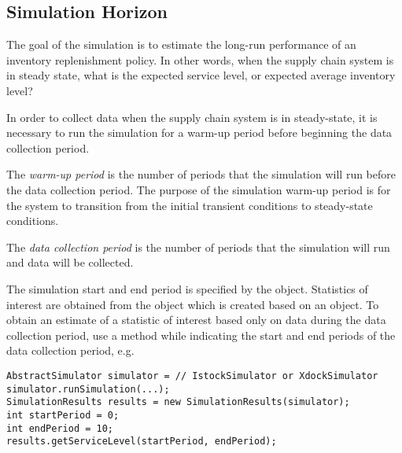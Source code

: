 \subsection{Simulation Horizon}

The goal of the simulation is to estimate
the long-run performance of an inventory replenishment policy.
In other words, when the supply chain system is in steady state,
what is the expected service level, or expected average inventory level?

In order to collect data when the supply chain system is in steady-state,
it is necessary to run the simulation for a warm-up period
before beginning the data collection period.

The \emph{warm-up period} is the number of periods
that the simulation will run before the data collection period.
The purpose of the simulation warm-up period
is for the system to transition
from the initial transient conditions
to steady-state conditions.

The \emph{data collection period} is the number of periods
that the simulation will run and data will be collected.

The simulation start and end period is specified
by the  object.
Statistics of interest are obtained from the
 object
which is created based on an  object.
To obtain an estimate of a statistic of interest
based only on data during the data collection period,
use a method while indicating the start and end periods
of the data collection period, e.g.
\begin{lstlisting}
AbstractSimulator simulator = // IstockSimulator or XdockSimulator
simulator.runSimulation(...);
SimulationResults results = new SimulationResults(simulator);
int startPeriod = 0;
int endPeriod = 10;
results.getServiceLevel(startPeriod, endPeriod);
\end{lstlisting}

